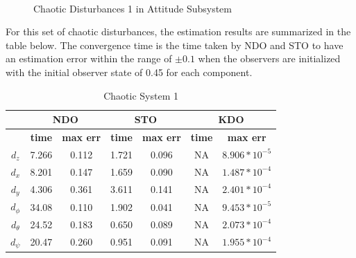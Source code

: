 \documentclass[letterpaper%
, twoside%
, 12pt%
,memoire%
, english%
,creativecommons,hyperref%
]{thETS}
\begin{document}
\begin{figure}[H]
\centering
{}
\\ \parbox{0.75\textwidth}{\caption{Chaotic Disturbances 1 in Attitude Subsystem}\label{dis_m1_att}}
\end{figure}


For this set of chaotic disturbances, the estimation results are summarized in the table below. The convergence time is the time taken by NDO and STO to have an estimation error within the range of $\pm0.1$ when the observers are initialized with the initial observer state of 0.45 for each component. 



\begin{table}[!htbp]
\centering
\caption{Chaotic System 1}
\begin{tabular}{|c|c|c|c|c|c|c|}
\hline
{}  &  \multicolumn{2}{c|}{\textbf{NDO}} & \multicolumn{2}{c|}{\textbf{STO}} & \multicolumn{2}{c|}{\textbf{KDO}}\\
\hline
{}        &  \textbf{time}  & \textbf{max err}  & \textbf{time}  & \textbf{max err}& \textbf{time}  & \textbf{max err}\\
$d_z$     &  7.266 & 0.112   & 1.721  & 0.096 & NA     & $8.906*10^{-5}$\\
$d_x$     &  8.201 & 0.147   & 1.659  & 0.090 & NA     & $1.487*10^{-4}$\\
$d_y$     &  4.306 & 0.361   & 3.611  & 0.141 & NA     & $2.401*10^{-4}$\\
$d_\phi$  &  34.08 & 0.110   & 1.902  & 0.041 & NA     & $9.453*10^{-5}$\\
$d_\theta$&  24.52 & 0.183   & 0.650  & 0.089 & NA     & $2.073*10^{-4}$\\
$d_\psi$  &  20.47 & 0.260   & 0.951  & 0.091 & NA     & $1.955*10^{-4}$\\

\hline
\end{tabular}
\end{table}
\end{document}
